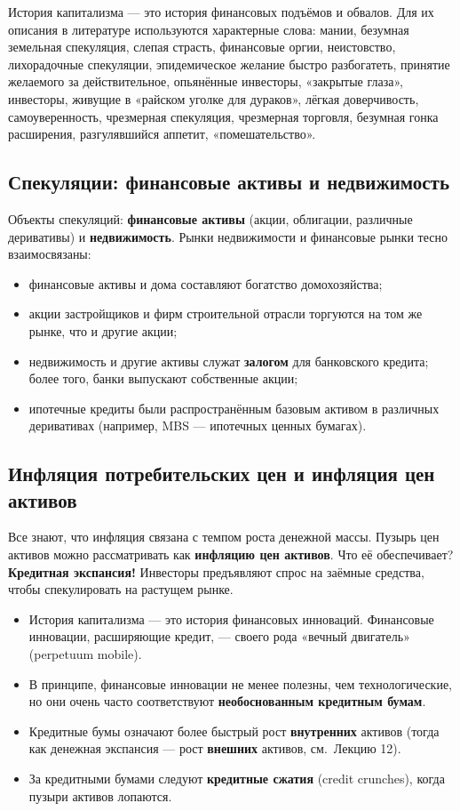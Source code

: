 \documentclass[10pt,a4paper]{article}
\begin{document}
История капитализма — это история финансовых подъёмов и обвалов. Для их описания в литературе используются характерные слова: мании, безумная земельная спекуляция, слепая страсть, финансовые оргии, неистовство, лихорадочные спекуляции, эпидемическое желание быстро разбогатеть, принятие желаемого за действительное, опьянённые инвесторы, «закрытые глаза», инвесторы, живущие в «райском уголке для дураков», лёгкая доверчивость, самоуверенность, чрезмерная спекуляция, чрезмерная торговля, безумная гонка расширения, разгулявшийся аппетит, «помешательство».

\subsection{Спекуляции: финансовые активы и недвижимость}

Объекты спекуляций: \textbf{финансовые активы} (акции, облигации, различные деривативы) и \textbf{недвижимость}. Рынки недвижимости и финансовые рынки тесно взаимосвязаны:
\begin{itemize}[leftmargin=1.3em]
\item финансовые активы и дома составляют богатство домохозяйства;
\item акции застройщиков и фирм строительной отрасли торгуются на том же рынке, что и другие акции;
\item недвижимость и другие активы служат \textbf{залогом} для банковского кредита; более того, банки выпускают собственные акции;
\item ипотечные кредиты были распространённым базовым активом в различных деривативах (например, MBS --- ипотечных ценных бумагах).
\end{itemize}

\subsection{Инфляция потребительских цен и инфляция цен активов}

Все знают, что инфляция связана с темпом роста денежной массы. Пузырь цен активов можно рассматривать как \textbf{инфляцию цен активов}. Что её обеспечивает? \textbf{Кредитная экспансия!} Инвесторы предъявляют спрос на заёмные средства, чтобы спекулировать на растущем рынке.

\begin{itemize}[leftmargin=1.3em]
\item История капитализма — это история финансовых инноваций. Финансовые инновации, расширяющие кредит, — своего рода «вечный двигатель» (perpetuum mobile).
\item В принципе, финансовые инновации не менее полезны, чем технологические, но они очень часто соответствуют \textbf{необоснованным кредитным бумам}.
\item Кредитные бумы означают более быстрый рост \textbf{внутренних} активов (тогда как денежная экспансия — рост \textbf{внешних} активов, см.\ Лекцию 12).
\item За кредитными бумами следуют \textbf{кредитные сжатия} (credit crunches), когда пузыри активов лопаются.
\end{itemize}
\end{document}
